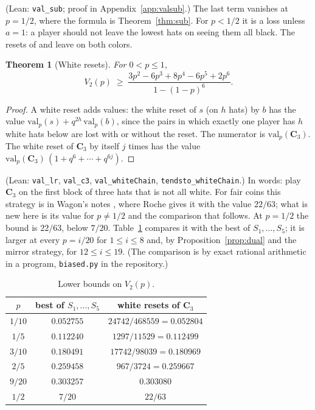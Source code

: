 \documentclass[11pt,a4paper]{article}
\newtheorem{theorem}{Theorem}
\theoremstyle{definition}
\theoremstyle{remark}
\newcommand{\lean}[1]{\texttt{#1}}
\newcommand{\C}{\mathbf{C}}
\begin{document}
(Lean: \lean{val\_sub}; proof in Appendix~\ref{app:valsub}.) The last term vanishes at $p = 1/2$, where the
formula is Theorem~\ref{thm:sub}. For $p < 1/2$ it is a loss unless
$a = 1$: a player should not leave the lowest hats on seeing them all
black. The resets of \cite{BFG} and \cite{BCCZW} leave on both colors.

\begin{theorem}[White resets]\label{thm:white}
For $0 < p \le 1$,
\[
  V_2(p) \;\ge\; \frac{3p^2 - 6p^3 + 8p^4 - 6p^5 + 2p^6}{1 - (1-p)^6} .
\]
\end{theorem}

\begin{proof}
A white reset adds values: the white reset of $s$ (on $h$ hats) by $b$
has the value $\mathrm{val}_p(s) + q^{2h}\,\mathrm{val}_p(b)$, since the
pairs in which exactly one player has $h$ white hats below are lost with
or without the reset. The numerator is $\mathrm{val}_p(\C_3)$. The
white reset of $\C_3$ by itself $j$ times has the value
$\mathrm{val}_p(\C_3)\,(1 + q^6 + \cdots + q^{6j})$.
\end{proof}

(Lean: \lean{val\_lr}, \lean{val\_c3}, \lean{val\_whiteChain},
\lean{tendsto\_whiteChain}.) In words: play $\C_3$ on the first block of
three hats that is not all white. For fair coins this strategy is in
Wagon's notes \cite{Wa14}, where Roche gives it with the value $22/63$;
what is new here is its value for $p \ne 1/2$ and the comparison that
follows. At $p = 1/2$ the bound is $22/63$,
below $7/20$. Table~\ref{tab:bias} compares it with the best of
$S_1,\ldots,S_5$; it is larger at every $p = i/20$ for $1 \le i \le 8$
and, by Proposition~\ref{prop:dual} and the mirror strategy, for
$12 \le i \le 19$. (The comparison is by exact rational arithmetic in a
program, \texttt{biased.py} in the repository.)

\begin{table}[ht]
\centering
\begin{tabular}{@{}ccc@{}}
\toprule
$p$ & best of $S_1,\ldots,S_5$ & white resets of $\C_3$ \\
\midrule
$1/10$ & $0.052755$ & $24742/468559 = 0.052804$ \\
$1/5$  & $0.112240$ & $1297/11529 = 0.112499$ \\
$3/10$ & $0.180491$ & $17742/98039 = 0.180969$ \\
$2/5$  & $0.259458$ & $967/3724 = 0.259667$ \\
$9/20$ & $0.303257$ & $0.303080$ \\
$1/2$  & $7/20$ & $22/63$ \\
\bottomrule
\end{tabular}
\caption{Lower bounds on $V_2(p)$.}\label{tab:bias}
\end{table}
\end{document}
